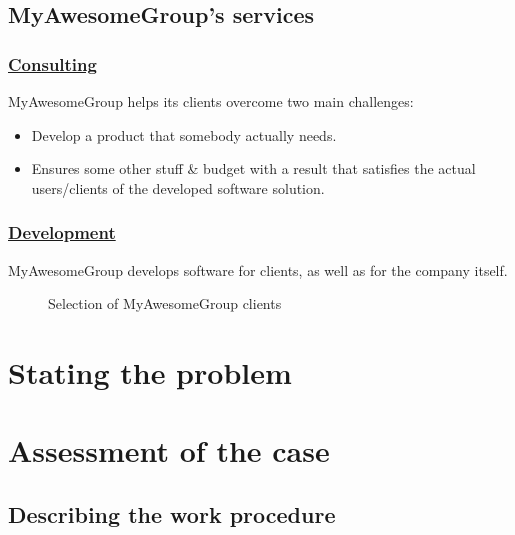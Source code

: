 \subsection{MyAwesomeGroup's services}
\subsubsection*{\underline{Consulting}}
MyAwesomeGroup helps its clients overcome two main challenges:
\begin{itemize}
    \item Develop a product that somebody actually needs.
    \item Ensures some other stuff \& budget with a result that satisfies the actual users/clients of the developed software solution.
\end{itemize}

\subsubsection*{\underline{Development}}
MyAwesomeGroup develops software for clients, as well as for the company itself.
\begin{figure}[H]
    \centering
    \caption{Selection of MyAwesomeGroup clients}
    \label{fig:selection-of-clients}
\end{figure}

\section{Stating the problem}
\lipsum[2][1]

\section{Assessment of the case}
\subsection{Describing the work procedure}


